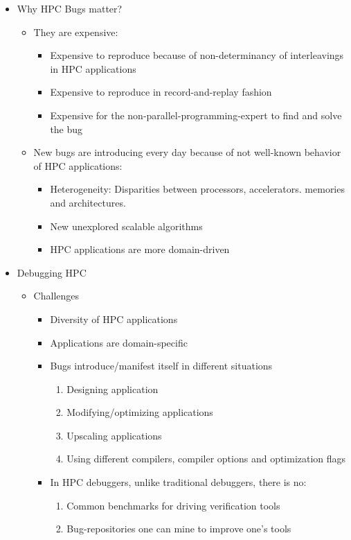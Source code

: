 
\begin{itemize}
\item Why HPC Bugs matter?
	\begin{itemize}
	\item They are expensive:
		\begin{itemize}
		\item Expensive to reproduce because of non-determinancy of interleavings in HPC applications
		\item Expensive to reproduce in record-and-replay fashion
		\item Expensive for the non-parallel-programming-expert to find and solve the bug 
		\end{itemize}
	\item New bugs are introducing every day because of not well-known behavior of HPC applications:
		\begin{itemize}
		\item Heterogeneity: Disparities between processors, accelerators. memories and architectures.
		\item New unexplored scalable algorithms
		\item HPC applications are more domain-driven
		\end{itemize}
	\end{itemize}
\item Debugging HPC
	\begin{itemize}
	\item Challenges
		\begin{itemize}
		\item Diversity of HPC applications
		\item Applications are domain-specific 
		\item Bugs introduce/manifest itself in different situations
			\begin{enumerate}
			\item Designing application
			\item Modifying/optimizing applications
			\item Upscaling applications
			\item Using different compilers, compiler options and optimization flags
			\end{enumerate}
		\item In HPC debuggers, unlike traditional debuggers, there is no:
			\begin{enumerate}
			\item  Common benchmarks for driving verification tools
			\item Bug-repositories one can mine to improve one’s tools

\end{enumerate}
\end{itemize}
\end{itemize}
\end{itemize}
